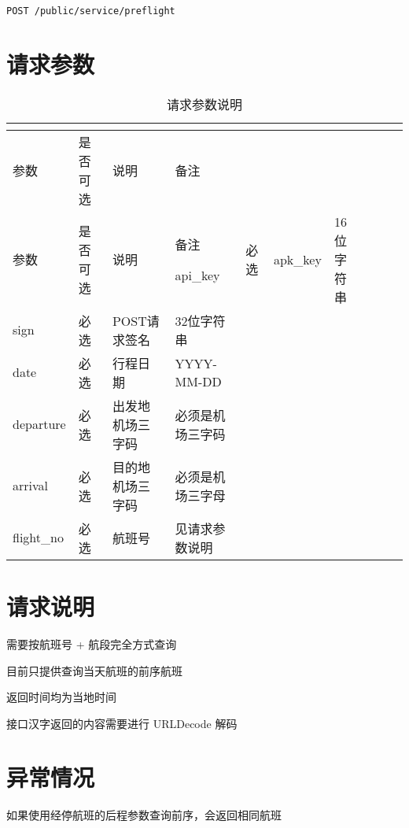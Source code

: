 \texttt{POST /public/service/preflight}

\section{请求参数}



\begin{longtable}{|m{60pt}|m{50pt}|m{90pt}|m{160pt}|}
\tabularnewline\hline
参数&是否可选&说明&备注
\endhead

\caption{请求参数说明}\\
\hline
参数&是否可选&说明&备注
\endfirsthead

\endfoot

\endlastfoot
\hline
api\_key   & 必选 & apk\_key & 16位字符串\\
\hline
sign            &必选 & POST请求签名& 32位字符串\\
\hline
date	            &必选 & 行程日期         &YYYY-MM-DD\\
\hline
departure &必选 &	出发地机场三字码 &必须是机场三字码\\
\hline
arrival        &必选 & 目的地机场三字码 &必须是机场三字母\\
\hline
flight\_no &必选 & 航班号             &见请求参数说明\\
\hline
\end{longtable}

\section{请求说明}

\begin{compactitem}
\item 需要按航班号 + 航段完全方式查询
\item 目前只提供查询当天航班的前序航班
\item 返回时间均为当地时间
\item 接口汉字返回的内容需要进行 URLDecode 解码
\end{compactitem}

\section{异常情况}

\begin{compactenum}
\item 如果使用经停航班的后程参数查询前序，会返回相同航班
\end{compactenum}


